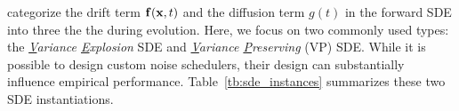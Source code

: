 \citet{song2020score} categorize the drift term ${\mathbf{f}}({\mathbf{x}}, t)$ and the diffusion term $g(t)$ in the forward SDE into three  the  the  during evolution. Here, we focus on two commonly used types: the \emph{\underline{V}ariance \underline{E}xplosion}  SDE and \emph{\underline{V}ariance \underline{P}reserving} (VP) SDE. While it is possible to design custom noise schedulers, their design can substantially influence empirical performance. 
Table~\ref{tb:sde_instances} summarizes these two SDE instantiations.
\begin{table}[th]
  \caption{Summary of the forward SDEs}
  \small
  \centering
  \label{tb:sde_instances}
\end{table}




